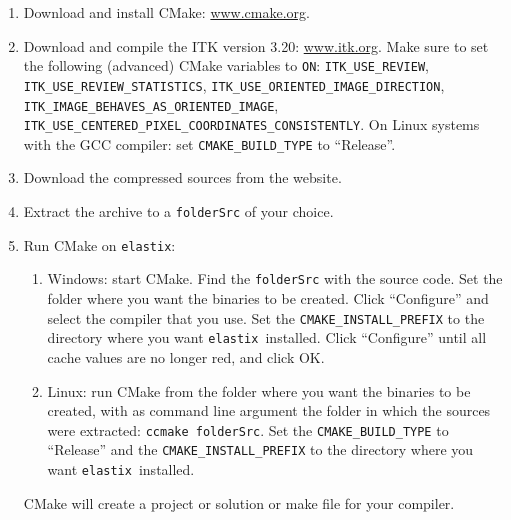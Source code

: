 \documentclass[]{report}
\newcommand{\elastix}{\texttt{elastix}}
\begin{document}
\begin{enumerate}
\item Download and install CMake: \url{www.cmake.org}.

\item Download and compile the ITK version 3.20: \url{www.itk.org}.
Make sure to set the following (advanced) CMake variables to
\texttt{ON}: \texttt{ITK\_USE\_REVIEW},
\texttt{ITK\_USE\_REVIEW\_STATISTICS},
\texttt{ITK\_USE\_ORIENTED\_IMAGE\_DIRECTION},
\texttt{ITK\_IMAGE\_BEHAVES\_AS\_ORIENTED\_IMAGE},
\texttt{ITK\_USE\_CENTERED\_PIXEL\_COORDINATES\_CONSISTENTLY}. On
Linux systems with the GCC compiler: set \texttt{CMAKE\_BUILD\_TYPE}
to ``Release''.


\item Download the compressed sources from the website.

\item Extract the archive to a \texttt{folderSrc} of your choice.

\item Run CMake on \elastix:
    \begin{enumerate}
    \item Windows: start CMake. Find the \texttt{folderSrc} with the
    source code. Set the folder where you want the binaries to be
    created. Click ``Configure'' and select the compiler that you
    use. Set the \texttt{CMAKE\_INSTALL\_PREFIX} to the directory
    where you want \elastix\ installed. Click ``Configure'' until
    all cache values are no longer red, and click OK.

    \item Linux: run CMake from the folder where you want the
    binaries to be created, with as command line argument the folder
    in which the sources were extracted: \texttt{ccmake folderSrc}.
    Set the \texttt{CMAKE\_BUILD\_TYPE} to ``Release'' and the
    \texttt{CMAKE\_INSTALL\_PREFIX} to the directory where you want
    \elastix\ installed.
    \end{enumerate}
CMake will create a project or solution or make file for your
compiler.


\end{enumerate}
\end{document}
